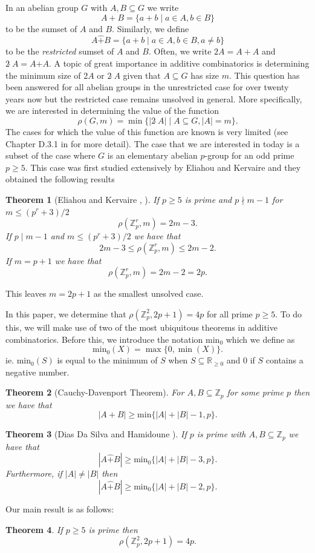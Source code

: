 \documentclass[a4paper, 12pt]{article}\usepackage[english]{babel}
\newtheorem{thm}{Theorem}[section]
\newcommand{\Z}{\mathbb{Z}}
\newcommand{\R}{\mathbb{R}}
\newcommand{\<}{\langle}
\begin{document}
In an abelian group $G$ with $A,B\subseteq G$ we write \[A+B=\{a+b\mid a\in A, b\in B\}\] to be the sumset of $A$ and $B$. Similarly, we define  \[A\hat{+}B=\{a+b\mid a\in A, b\in B,a\neq b\}\] to be the \emph{restricted} sumset of $A$ and $B$. Often, we write $2A=A+A$ and $2\hat{\;}A=A\hat{+}A$. A topic of great importance in additive combinatorics is determining the minimum size of $2A$ or $2\hat{\;}A$ given that $A\subseteq G$
 has size $m$. This question has been answered for all abelian groups in the unrestricted case for over twenty years now \cite{SmallSums} but the restricted case remains unsolved in general. More specifically, we are interested in determining the value of the function \[\rho(G,m)=\min\{|2\hat{\;}A|\mid A\subseteq G, |A|=m\}.\] The cases for which the value of this function are known is very limited (see Chapter D.3.1 in \cite{Baj:2018a} for more detail). The case that we are interested in today is a subset of the case where $G$ is an elementary abelian $p$-group for an odd prime $p\geq 5$. This case was first studied extensively by Eliahou and Kervaire and they obtained the following results 
 \begin{thm}[Eliahou and Kervaire  \cite{EKfirst}, \cite{EliKer}]
     If $p\geq 5$ is prime and $p\nmid m-1$ for $m\leq (p^r+3)/2$ \[\rho(\Z_p^r,m)=2m-3.\] 
If $p\mid m-1$ and $m\leq (p^r+3)/2$ we have that
\[2m-3\leq \rho(\Z_p^r,m)\leq 2m-2.\]
If $m=p+1$ we have that
     \[\rho(\Z_p^r,m)=2m-2=2p.\]
 \end{thm}
 This leaves $m=2p+1$ as the smallest unsolved case.
 
In this paper, we determine that $\rho(\Z_{p}^2,2p+1)=4p$ for all prime $p\geq 5$. To do this, we will make use of two of the most ubiquitous theorems in additive combinatorics. Before this, we introduce the notation $\mathrm{min}_0$ which we define as \[\mathrm{min}_0(X)=\max\{0,\min(X)\}.\] ie. $\mathrm{min}_0(S)$ is equal to the minimum of $S$ when $S\subseteq \R_{\geq 0}$ and $0$ if $S$ contains a negative number.
 


\begin{thm}[Cauchy-Davenport Theorem]
For $A,B\subseteq \Z_p$ for some prime $p$ then we have that \[|A+B|\geq \mathrm{min}\{|A|+|B|-1,p\}.\] \label{cdt}
\end{thm}
\begin{thm}[Dias Da Silva and Hamidoune \cite{DDSandH}]
\label{ehc}
If $p$ is prime with $A,B\subseteq \Z_p$ we have that \[|A\hat{+}B|\geq\mathrm{min}_0\{|A|+|B|-3,p\}.\] Furthermore, if $|A|\neq |B|$ then
\[|A\hat{+}B|\geq\mathrm{min}_0\{|A|+|B|-2,p\}.\] 
\end{thm}
Our main result is as follows:
\begin{thm}\label{maintheorem}
If $p\geq 5$ is prime then \[\rho(\Z_p^2,2p+1)=4p.\]
\end{thm}
\end{document}
